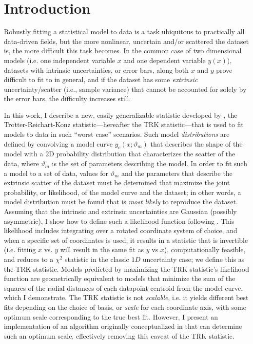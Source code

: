 \chapter{Introduction}
\label{cha:section_introduction}
Robustly fitting a statistical model to data is a task ubiquitous to practically all data-driven fields, but the more nonlinear, uncertain and/or scattered the dataset is, the more difficult this task becomes. In the common case of two dimensional models (i.e. one independent variable $x$ and one dependent variable $y(x)$), datasets with intrinsic uncertainties, or error bars, along both $x$ and $y$ prove difficult to fit to in general, and if the dataset has some \textit{extrinsic} uncertainty/scatter (i.e., sample variance) that cannot be accounted for solely by the error bars, the difficulty increases still.

In this work, I describe a new, easily generalizable statistic developed by \textcite{trotter}, the Trotter-Reichart-Konz statistic---hereafter the TRK statistic---that is used to fit models to data in such ``worst case'' scenarios. Such model \textit{distributions} are defined by convolving a model curve $y_c(x;\vartheta_m)$ that describes the shape of the model with a 2D probability distribution that characterizes the scatter of the data, where $\vartheta_m$ is the set of parameters describing the model. In order to fit such a model to a set of data, values for $\vartheta_m$ and the parameters that describe the extrinsic scatter of the dataset must be determined that maximize the joint probability, or likelihood, of the model curve and the dataset; in other words, a model distribution must be found that is \textit{most likely} to reproduce the dataset. Assuming that the intrinsic and extrinsic uncertainties are Gaussian (possibly asymmetric), I show how to define such a likelihood function following \textcite{trotter}. This likelihood includes integrating over a rotated coordinate system of choice, and when a specific set of coordinates is used, it results in a statistic that is invertible (i.e. fitting $x$ vs. $y$ will result in the same fit as $y$ vs $x$), computationally feasible, and reduces to a $\chi^2$ statistic in the classic $1D$ uncertainty case; we define this as the TRK statistic. Models predicted by maximizing the TRK statistic's likelihood function are geometrically equivalent to models that minimize the sum of the squares of the radial distances of each datapoint centroid from the model curve, which I demonstrate. The TRK statistic is not \textit{scalable}, i.e. it yields different best fits depending on the choice of basis, or \textit{scale} for each coordinate axis, with some optimum scale corresponding to the true best fit. However, I present an implementation of an algorithm originally conceptualized in \textcite{trotter} that can determine such an optimum scale, effectively removing this caveat of the TRK statistic. 

